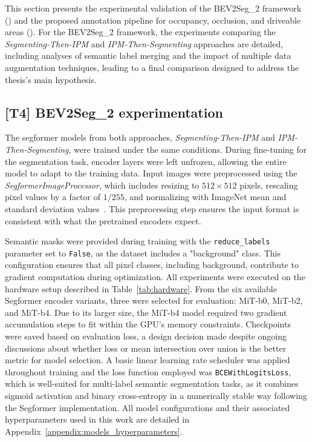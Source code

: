 This section presents the experimental validation of the BEV2Seg\_2 framework () and the proposed annotation pipeline for occupancy, occlusion, and driveable areas (). For the BEV2Seg\_2 framework, the experiments comparing the \textit{Segmenting-Then-IPM} and \textit{IPM-Then-Segmenting} approaches are detailed, including analyses of semantic label merging and the impact of multiple data augmentation techniques, leading to a final comparison designed to address the thesis's main hypothesis.


\subsection{[T4] BEV2Seg\_2 experimentation} \label{sec:bev2seg_2_experimentation}
The segformer models from both approaches, \textit{Segmenting-Then-IPM} and \textit{IPM-Then-Segmenting}, were trained under the same conditions. During fine-tuning for the segmentation task, encoder layers were left unfrozen, allowing the entire model to adapt to the training data. Input images were preprocessed using the \textit{SegformerImageProcessor}, which includes resizing to $512 \times 512$ pixels, rescaling pixel values by a factor of $1/255$, and normalizing with ImageNet mean and standard deviation values~\cite{imagenet}. This preprocessing step ensures the input format is consistent with what the pretrained encoders expect.

Semantic masks were provided during training with the \texttt{reduce\_labels} parameter set to \texttt{False}, as the dataset includes a "background" class. This configuration ensures that all pixel classes, including background, contribute to gradient computation during optimization. All experiments were executed on the hardware setup described in Table~\ref{tab:hardware}. From the six available Segformer encoder variants, three were selected for evaluation: MiT-b0, MiT-b2, and MiT-b4. Due to its larger size, the MiT-b4 model required two gradient accumulation steps to fit within the GPU's memory constraints. Checkpoints were saved based on evaluation loss, a design decision made despite ongoing discussions about whether loss or mean intersection over union is the better metric for model selection. A basic linear learning rate scheduler was applied throughout training and the loss function employed was \texttt{BCEWithLogitsLoss}, which is well-suited for multi-label semantic segmentation tasks, as it combines sigmoid activation and binary cross-entropy in a numerically stable way following the Segformer implementation. All model configurations and their associated hyperparameters used in this work are detailed in Appendix~\ref{appendix:models_hyperparameters}.

